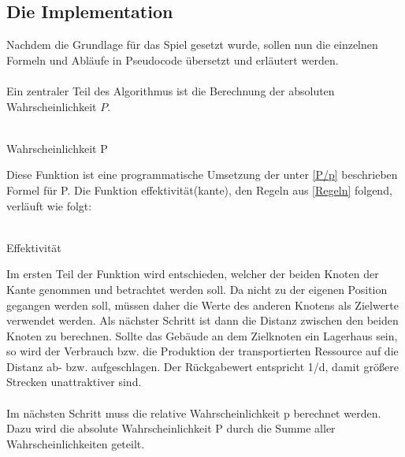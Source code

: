 \documentclass[12pt]{article}
\begin{document}
\subsection{Die Implementation}\label{pseudo}
Nachdem die Grundlage für das Spiel gesetzt wurde, sollen nun die einzelnen Formeln und Abläufe in Pseudocode übersetzt und erläutert werden. \\\\
Ein zentraler Teil des Algorithmus ist die Berechnung der absoluten Wahrscheinlichkeit $P$. \\\\
\begin{algorithm}[H]
 \caption{Wahrscheinlichkeit P}
 \DontPrintSemicolon

\end{algorithm}Diese Funktion ist eine programmatische Umsetzung der unter \ref{P/p} beschrieben Formel für P.
Die Funktion effektivität(kante), den Regeln aus \ref{Regeln}  folgend, verläuft wie folgt:\\\\
\begin{algorithm}[H]
\caption{Effektivität}
\DontPrintSemicolon
{}
\end{algorithm}Im ersten Teil der Funktion wird entschieden, welcher der beiden Knoten der Kante genommen und betrachtet werden soll. Da nicht zu der eigenen Position gegangen werden soll, müssen daher die Werte des anderen Knotens als Zielwerte verwendet werden. Als nächster Schritt ist dann die Distanz zwischen den beiden Knoten zu berechnen. Sollte das Gebäude an dem Zielknoten ein Lagerhaus sein, so wird der Verbrauch bzw. die Produktion der transportierten Ressource auf die Distanz ab- bzw. aufgeschlagen. 
Der Rückgabewert entspricht 1/d, damit größere Strecken unattraktiver sind.\\\\
Im nächsten Schritt muss die relative Wahrscheinlichkeit p berechnet werden. Dazu wird die absolute Wahrscheinlichkeit P durch die Summe aller Wahrscheinlichkeiten geteilt.\\\\
\end{document}
